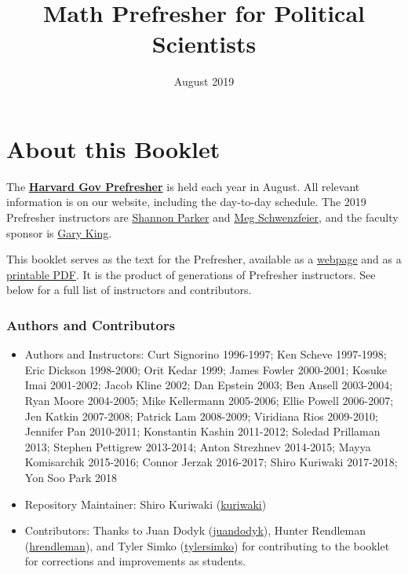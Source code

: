 \documentclass[]{book}
\title{Math Prefresher for Political Scientists}
\author{}
\date{August 2019}
\providecommand{\tightlist}{%
  \setlength{\itemsep}{0pt}\setlength{\parskip}{0pt}}
\theoremstyle{definition}
\theoremstyle{definition}
\theoremstyle{definition}
\theoremstyle{remark}
\begin{document}
\maketitle

{
\setcounter{tocdepth}{1}
\tableofcontents
}
\hypertarget{about-this-booklet}{%
\chapter*{About this Booklet}\label{about-this-booklet}}

The \href{https://projects.iq.harvard.edu/prefresher}{\textbf{Harvard Gov Prefresher}} is held each year in August. All relevant information is on our website, including the day-to-day schedule. The 2019 Prefresher instructors are \href{https://wcfia.harvard.edu/shannon-lynn-parker}{Shannon Parker} and \href{http://schwenzfeier.github.io/}{Meg Schwenzfeier}, and the faculty sponsor is \href{https://gking.harvard.edu}{Gary King}.

This booklet serves as the text for the Prefresher, available as a \href{https://iqss.github.io/prefresher/}{webpage} and as a \href{https://github.com/IQSS/prefresher/releases}{printable PDF}. It is the product of generations of Prefresher instructors. See below for a full list of instructors and contributors.

\hypertarget{authors-and-contributors}{%
\subsection*{Authors and Contributors}\label{authors-and-contributors}}

\begin{itemize}
\tightlist
\item
  Authors and Instructors: Curt Signorino 1996-1997; Ken Scheve 1997-1998; Eric Dickson 1998-2000; Orit Kedar 1999; James Fowler 2000-2001; Kosuke Imai 2001-2002; Jacob Kline 2002; Dan Epstein 2003; Ben Ansell 2003-2004; Ryan Moore 2004-2005; Mike Kellermann 2005-2006; Ellie Powell 2006-2007; Jen Katkin 2007-2008; Patrick Lam 2008-2009; Viridiana Rios 2009-2010; Jennifer Pan 2010-2011; Konstantin Kashin 2011-2012; Soledad Prillaman 2013; Stephen Pettigrew 2013-2014; Anton Strezhnev 2014-2015; Mayya Komisarchik 2015-2016; Connor Jerzak 2016-2017; Shiro Kuriwaki 2017-2018; Yon Soo Park 2018
\item
  Repository Maintainer: Shiro Kuriwaki (\href{https://github.com/kuriwaki}{kuriwaki})
\item
  Contributors: Thanks to Juan Dodyk (\href{https://github.com/juandodyk}{juandodyk}), Hunter Rendleman (\href{https://github.com/hrendleman}{hrendleman}), and Tyler Simko (\href{https://github.com/tylersimko}{tylersimko}) for contributing to the booklet for corrections and improvements as students.
\end{itemize}
\end{document}
